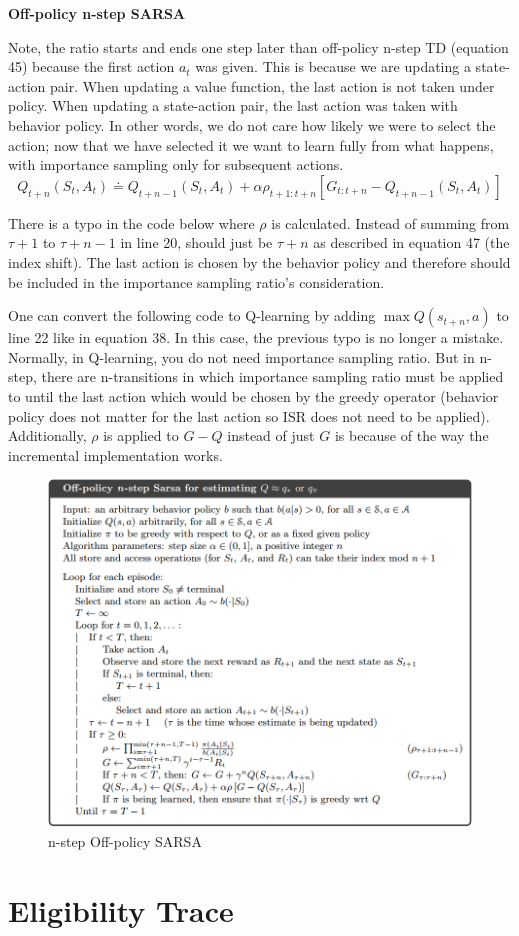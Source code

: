 \documentclass{article}
\begin{document}
\noindent
\textbf{Off-policy n-step SARSA}

\noindent
Note, the ratio starts and ends one step later than off-policy n-step TD
(equation 45) because the first action $a_{t}$ was given. This is because we are
updating a state-action pair. When updating a value function, the last action is
not taken under policy. When updating a state-action pair, the last action was
taken with behavior policy. In other words, we do not care how likely we were to
select the action; now that we have selected it we want to learn fully from what
happens, with importance sampling only for subsequent actions.
\begin{equation}
Q_{t+n}\left(S_{t}, A_{t}\right) \doteq Q_{t+n-1}\left(S_{t}, A_{t}\right)+\alpha \rho_{t+1: t+n}\left[G_{t: t+n}-Q_{t+n-1}\left(S_{t}, A_{t}\right)\right]
\end{equation}

\noindent
There is a typo in the code below where $\rho$ is calculated. Instead of summing
from $\tau + 1$ to $\tau + n -1$ in line 20, should just be $\tau + n$ as
described in equation 47 (the index shift). The last action is chosen by the
behavior policy and therefore should be included in the importance sampling
ratio's consideration.

One can convert the following code to Q-learning by adding $\max Q(s_{t+n}, a)$
to line 22 like in equation 38. In this case, the previous typo is no longer a
mistake. Normally, in Q-learning, you do not need importance sampling ratio. But
in n-step, there are n-transitions in which importance sampling ratio must be
applied to until the last action which would be chosen by the greedy operator
(behavior policy does not matter for the last action so ISR does not need to be
applied). Additionally, $\rho$ is applied to $G - Q$ instead of just $G$ is
because of the way the incremental implementation works.

\begin{figure}[h]
\includegraphics[scale=0.35]{nstep_offpolicy_sarsa}
\centering
\caption{n-step Off-policy SARSA}
\end{figure}

\newpage
\section{Eligibility Trace}
\end{document}
